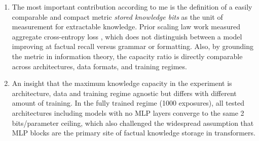 \documentclass{article}
\begin{document}
\begin{enumerate}[leftmargin=*]

  \item 
  The most important contribution according to me is the definition of a easily comparable and compact metric \textit{stored knowledge bits} as the unit of measurement for extractable knowledge. Prior scaling law work measured aggregate cross-entropy loss \cite{kaplan2020scaling, hoffmann2022chinchilla}, which does not distinguish between a model improving at factual recall versus grammar or formatting. Also, by grounding the metric in information theory, the capacity ratio is directly comparable across architectures, data formats, and training regimes.

  \item An insight that the maximum knowledge capacity in the experiment is architecture, data and training regime agnostic but differs with different amount of training.
   In the fully trained regime (1000 exposures), all tested architectures including models with no MLP layers converge to the same 2 bits/parameter ceiling, which also challenged the widespread assumption that MLP blocks are the primary site of factual knowledge storage in transformers.



\end{enumerate}
\end{document}
